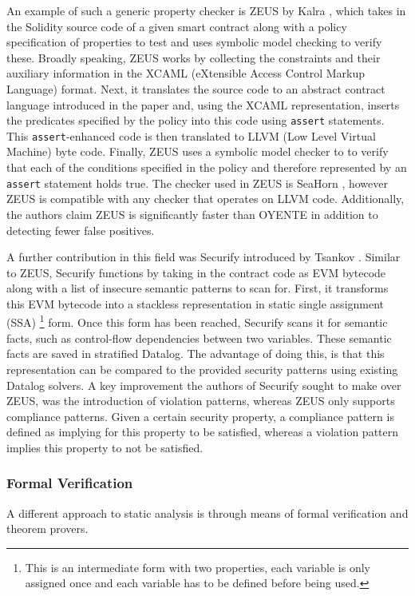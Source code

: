 \documentclass[letterpaper,twocolumn,10pt]{article}
\begin{document}
An example of such a generic property checker is ZEUS by Kalra \cite{kalra_goel_dhawan_sharma_2018}, which takes in the Solidity source code of a given smart contract along with a policy specification of properties to test and uses symbolic model checking to verify these. Broadly speaking, ZEUS works by collecting the constraints and their auxiliary information in the XCAML (eXtensible Access Control Markup Language) format. Next, it translates the source code to an abstract contract language introduced in the paper and, using the XCAML representation, inserts the predicates specified by the policy into this code using \verb|assert| statements. This \verb|assert|-enhanced code is then translated to LLVM (Low Level Virtual Machine) \cite{lattner_adve} byte code. Finally, ZEUS uses a symbolic model checker to to verify that each of the conditions specified in the policy and therefore represented by an \verb|assert| statement holds true. The checker used in ZEUS is SeaHorn \cite{gurfinkel_kahsai_komuravelli_navas_2015}, however ZEUS is compatible with any checker that operates on LLVM code. Additionally, the authors claim ZEUS is significantly faster than OYENTE in addition to detecting fewer false positives. 


A further contribution in this field was Securify introduced by Tsankov \cite{tsankov_dan_drachsler-cohen_gervais_bünzli_vechev_2018}.  Similar to ZEUS, Securify functions by taking in the contract code as EVM bytecode along with a list of insecure semantic patterns to scan for. First, it transforms this EVM bytecode into a stackless representation in static single assignment (SSA) \footnote{This is an intermediate form with two properties, each variable is only assigned once and each variable has to be defined before being used.} form. Once this form has been reached, Securify scans it for semantic facts, such as control-flow dependencies between two variables. These semantic facts are saved in stratified Datalog. The advantage of doing this, is that this representation can be compared to the provided security patterns using existing Datalog solvers. A key improvement the authors of Securify sought to make over ZEUS, was the introduction of violation patterns, whereas ZEUS only supports compliance patterns. Given a certain security property, a compliance pattern is defined as implying for this property to be satisfied, whereas a violation pattern implies this property to not be satisfied.


\subsubsection{Formal Verification}
A different approach to static analysis is through means of formal verification and theorem provers. 
\end{document}

